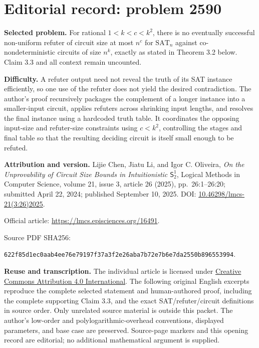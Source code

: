 \documentclass[11pt]{article}
\newcommand{\SAT}{\mathrm{SAT}}
\begin{document}
\section*{Editorial record: problem 2590}
\noindent\textbf{Selected problem.} For rational $1<k<c<k^2$, there is no eventually successful non-uniform refuter of circuit size at most $n^c$ for $\SAT_n$ against co-nondeterministic circuits of size $n^k$, exactly as stated in Theorem 3.2 below. Claim 3.3 and all context remain uncounted.

\noindent\textbf{Difficulty.} A refuter output need not reveal the truth of its SAT instance efficiently, so one use of the refuter does not yield the desired contradiction. The author's proof recursively packages the complement of a longer instance into a smaller-input circuit, applies refuters across shrinking input lengths, and resolves the final instance using a hardcoded truth table. It coordinates the opposing input-size and refuter-size constraints using $c<k^2$, controlling the stages and final table so that the resulting deciding circuit is itself small enough to be refuted.

\noindent\textbf{Attribution and version.} Lijie Chen, Jiatu Li, and Igor C. Oliveira, \emph{On the Unprovability of Circuit Size Bounds in Intuitionistic $\mathsf{S}^1_2$}, Logical Methods in Computer Science, volume 21, issue 3, article 26 (2025), pp.\ 26:1--26:20; submitted April 22, 2024; published September 10, 2025. DOI: \href{https://doi.org/10.46298/lmcs-21(3:26)2025}{10.46298/lmcs-21(3:26)2025}. \par\noindent Official article: \url{https://lmcs.episciences.org/16491}.\par\noindent Source PDF SHA256:\par\noindent\texttt{622f85d1ec0aab4ee76e79197f37a3f2e26aba7b72e7b6e7da2550b896553994}.

\noindent\textbf{Reuse and transcription.} The individual article is licensed under \href{https://creativecommons.org/licenses/by/4.0/}{Creative Commons Attribution 4.0 International}. The following original English excerpts reproduce the complete selected statement and human-authored proof, including the complete supporting Claim 3.3, and the exact SAT/refuter/circuit definitions in source order. Only unrelated source material is outside this packet. The author's low-order and polylogarithmic-overhead conventions, displayed parameters, and base case are preserved. Source-page markers and this opening record are editorial; no additional mathematical argument is supplied.
\end{document}
